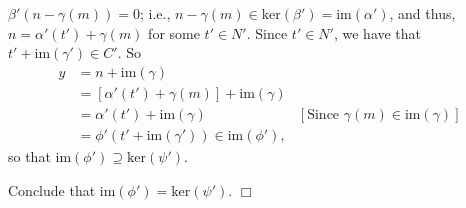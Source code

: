 \documentclass[9pt]{article}
\newcommand{\qed}{\hfill \ensuremath{\Box}}
\begin{document}
\begin{enumerate}
\begin{itemize}
               $\beta'(n - \gamma(m)) = 0$; i.e.,
               $n - \gamma(m) \in \text{ker}(\beta') = \text{im}(\alpha')$, and
               thus, $n = \alpha'(t') + \gamma(m)$ for some $t' \in N'$. Since
               $t' \in N'$, we have that $t' + \text{im}(\gamma') \in C'$. So
               \begin{align*}
                  y &= n + \text{im}(\gamma) \\
                    &= [\alpha'(t') + \gamma(m)] + \text{im}(\gamma) \\
                    &= \alpha'(t') + \text{im}(\gamma) &[\text{Since }\gamma(m)
                          \in \text{im}(\gamma)] \\
                    &= \phi'(t' + \text{im}(\gamma')) \in \text{im}(\phi'),
               \end{align*}
               so that $\text{im}(\phi') \supseteq \text{ker}(\psi')$.
      \end{itemize}
      Conclude that $\text{im}(\phi') = \text{ker}(\psi')$. \qed
\end{enumerate}
\end{document}
